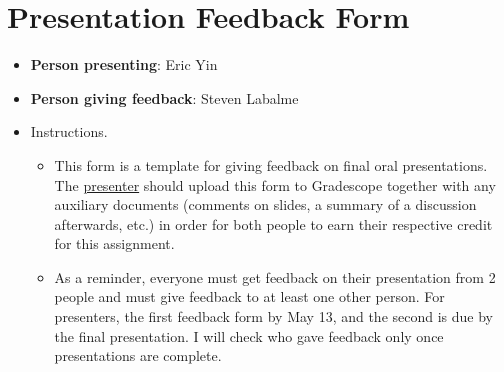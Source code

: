 \documentclass[../finalProject.tex]{subfiles}
\begin{document}
\section*{Presentation Feedback Form}
\begin{itemize}
    \item {}\textbf{Person presenting}: Eric Yin
    \item \textbf{Person giving feedback}: Steven Labalme
    \item Instructions.
    \begin{itemize}
        \item This form is a template for giving feedback on final oral presentations. The \underline{presenter} should upload this form to Gradescope together with any auxiliary documents (comments on slides, a summary of a discussion afterwards, etc.) in order for both people to earn their respective credit for this assignment.
        \item As a reminder, everyone must get feedback on their presentation from 2 people and must give feedback to at least one other person. For presenters, the first feedback form by May 13, and the second is due by the final presentation. I will check who gave feedback only once presentations are complete.
    \end{itemize}
\end{itemize}

    
\end{document}
